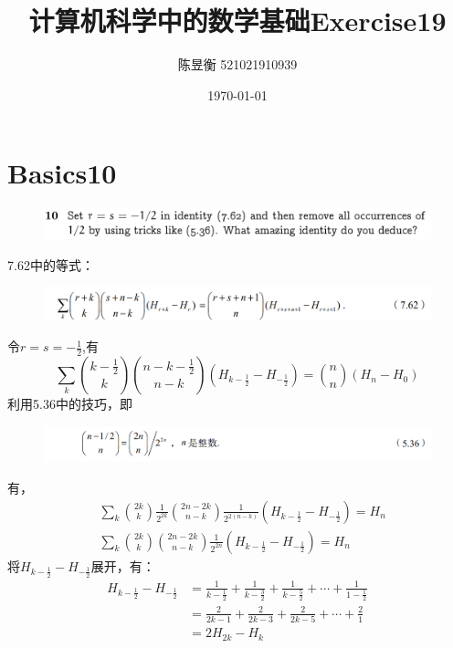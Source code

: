 \documentclass[]{article}
\title{计算机科学中的数学基础Exercise19}
\author{陈昱衡 521021910939}
\date{\today}
\begin{document}
\maketitle


\section{Basics10}
\begin{figure}[H]
    \includegraphics[scale = 0.3]{2023-05-06-17-43-50.png}
\end{figure}
\par 
7.62中的等式：
\begin{figure}[H]
    \centering
    \includegraphics[scale = 0.3]{2023-05-06-17-01-28.png}
\end{figure}
\par 
令$r=s=-\frac{1}{2}$,有
\begin{equation}
    \sum_{k}\binom{k-\frac{1}{2}}{k}\binom{n-k-\frac{1}{2}}{n-k}(H_{k-\frac{1}{2}} - H_{-\frac{1}{2}}) = \binom{n}{n}(H_{n}-H_{0})
\end{equation}
利用5.36中的技巧，即
\begin{figure}[H]
    \centering
    \includegraphics[scale = 0.3]{2023-05-06-17-50-44.png}
\end{figure}
有，
\begin{align}
    &\sum_{k}\binom{2k}{k}\frac{1}{2^{2k}}\binom{2n-2k}{n-k}\frac{1}{2^{2(n-k)}}(H_{k-\frac{1}{2}}-H_{-\frac{1}{2}}) = H_{n}\\
    &\sum_{k}\binom{2k}{k}\binom{2n-2k}{n-k}\frac{1}{2^{2n}}(H_{k-\frac{1}{2}} - H_{-\frac{1}{2}}) = H_{n} 
\end{align}
将$H_{k-\frac{1}{2}} - H_{-\frac{1}{2}}$展开，有：
\begin{align}
    H_{k-\frac{1}{2}} - H_{-\frac{1}{2}} &= \frac{1}{k - \frac{1}{2}} + \frac{1}{k - \frac{3}{2}} + \frac{1}{k - \frac{5}{2}} + \cdots + \frac{1}{1-\frac{1}{2}}\\
    &=\frac{2}{2k-1} + \frac{2}{2k-3} + \frac{2}{2k-5} + \cdots + \frac{2}{1}\\
    &=2H_{2k} - H_{k}
\end{align}
\end{document}
